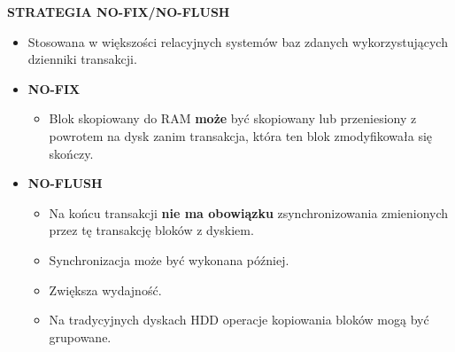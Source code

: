 \documentclass[a5paper,6pt]{article}
\begin{document}
    \textbf{STRATEGIA NO-FIX/NO-FLUSH}
    \begin{itemize}
        \item Stosowana w większości relacyjnych systemów baz zdanych
              wykorzystujących dzienniki transakcji.

        \item \textbf{NO-FIX}
        \begin{itemize}
            \item Blok skopiowany do RAM \textbf{może} być skopiowany lub
                  przeniesiony z powrotem na dysk zanim transakcja, która ten
                  blok zmodyfikowała się skończy.
        \end{itemize}

        \item \textbf{NO-FLUSH}
        \begin{itemize}
            \item Na końcu transakcji \textbf{nie ma obowiązku}
                  zsynchronizowania zmienionych przez tę transakcję bloków
                  z dyskiem.
            \item Synchronizacja może być wykonana później.
            \item Zwiększa wydajność.
            \item Na tradycyjnych dyskach HDD operacje kopiowania bloków mogą
                  być grupowane.
        \end{itemize}
    \end{itemize}
\end{document}
